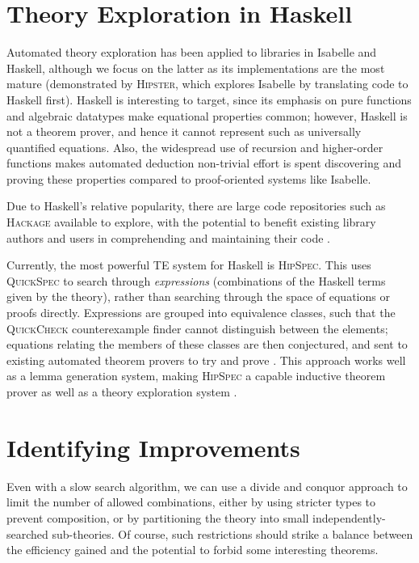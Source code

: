 \documentclass{eceasst}
\begin{document}
\section{Theory Exploration in Haskell}

Automated theory exploration has been applied to libraries in Isabelle
and Haskell, although we focus on the latter as its implementations are
the most mature (demonstrated by \textsc{Hipster}, which explores Isabelle by
translating code to Haskell first). Haskell is interesting to target,
since its emphasis on pure functions and algebraic datatypes make equational
properties common; however, Haskell is not a theorem prover, and hence it cannot
represent such as universally quantified equations. Also, the widespread use of
recursion and higher-order functions makes automated deduction non-trivial
effort is spent discovering and proving these properties compared to
proof-oriented systems like Isabelle.

Due to Haskell's relative popularity, there are large code repositories
such as \textsc{Hackage} available to explore, with the potential to
benefit existing library authors and users in comprehending and
maintaining their code \cite{QuickSpec}.

Currently, the most powerful TE system for Haskell is \textsc{HipSpec}.
This uses \textsc{QuickSpec} to search through \emph{expressions}
(combinations of the Haskell terms given by the theory), rather than
searching through the space of equations or proofs directly. Expressions
are grouped into equivalence classes, such that the \textsc{QuickCheck}
counterexample finder cannot distinguish between the elements; equations
relating the members of these classes are then conjectured, and sent to
existing automated theorem provers to try and prove \cite{rosen2012proving}. This
approach works well as a lemma generation system, making
\textsc{HipSpec} a capable inductive theorem prover as well as a theory
exploration system \cite{claessen2013automating}.

\section{Identifying Improvements}

Even with a slow search algorithm, we can use a divide and conquor
approach to limit the number of allowed combinations, either by using
stricter types to prevent composition, or by partitioning the theory
into small independently-searched sub-theories. Of course, such
restrictions should strike a balance between the efficiency gained and
the potential to forbid some interesting theorems.
\end{document}
